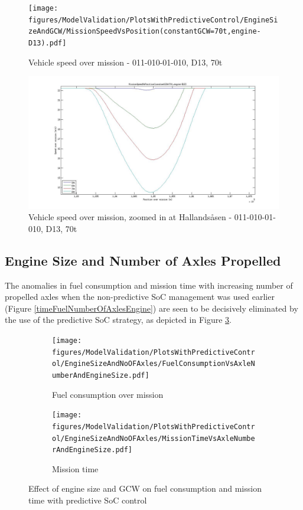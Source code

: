 \documentclass[ExampleMasters.tex]{subfiles}
\begin{document}
\begin{figure}[h!]
\centering
\texttt{[image: figures/ModelValidation/PlotsWithPredictiveControl/EngineSizeAndGCW/MissionSpeedVsPosition(constantGCW=70t,engine-D13).pdf]}
\caption{Vehicle speed over mission - 011-010-01-010, D13, 70t}
\label{speedEngineDownsizingPredictiveSoC}
\end{figure} 

\begin{figure}[h!]
\centering
\includegraphics[width=0.6\linewidth]{figures/ModelValidation/PlotsWithPredictiveControl/EngineSizeAndGCW/MissionSpeedZoomedInD13.jpg}
\caption{Vehicle speed over mission, zoomed in at Hallands\aa sen - 011-010-01-010, D13, 70t}
\label{speedEngineDownsizingPredictiveSoC}
\end{figure} 

\subsection{Engine Size and Number of Axles Propelled}
The anomalies in fuel consumption and mission time with increasing number of propelled axles when the non-predictive SoC management was used earlier (Figure \ref{timeFuelNumberOfAxlesEngine}) are seen to be decisively eliminated by the use of the predictive SoC strategy, as depicted in Figure \ref{timeFuelAxleEnginePredictiveSoC}.

\begin{figure}[h!]
\begin{subfigure}{.5\textwidth}
	\centering
	\texttt{[image: figures/ModelValidation/PlotsWithPredictiveControl/EngineSizeAndNoOFAxles/FuelConsumptionVsAxleNumberAndEngineSize.pdf]}
	\caption{Fuel consumption over mission}
\end{subfigure}
\begin{subfigure}{.5\textwidth}
	\centering
	\texttt{[image: figures/ModelValidation/PlotsWithPredictiveControl/EngineSizeAndNoOFAxles/MissionTimeVsAxleNumberAndEngineSize.pdf]}
	\caption{Mission time}
\end{subfigure}
\caption{Effect of engine size and GCW on fuel consumption and mission time with predictive SoC control}
\label{timeFuelAxleEnginePredictiveSoC}
\end{figure}
\end{document}
